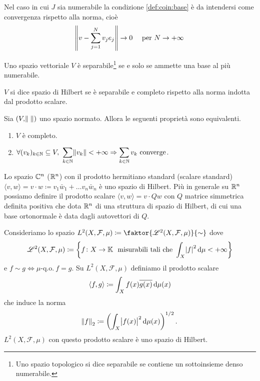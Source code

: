 Nel caso in cui $ J $ sia numerabile la condizione \ref{def:coin:base} è da intendersi come convergenza rispetto alla norma, cioè
\[
    \norm{v - \sum_{j = 1}^{N} v_j e_j} \to 0 \quad \text{ per } N \to +\infty
\]

\begin{proposition}
   Uno spazio vettoriale $ V $ è separabile\footnote{Uno spazio topologico si dice separabile se contiene un sottoinsieme denso numerabile.} se e solo se ammette una base al più numerabile.
\end{proposition}

\begin{definition}
    $ V $ si dice spazio di Hilbert se è separabile e completo rispetto alla norma indotta dal prodotto scalare.
\end{definition}

\begin{thm}
    Sia $ (V, \norm{\;}) $ uno spazio normato. Allora le seguenti proprietà sono equivalenti.
    \begin{enumerate}[label=(\roman*)]
        \item $ V $ è completo.
        \item $ \forall (v_k)_{k \in \mathbb{N}} \subseteq V, \ \displaystyle{\sum_{k \in \mathbb{N}} \norm{v_k} < +\infty \Rightarrow \sum_{k \in \mathbb{N}} v_k} \text{ converge} $. 
    \end{enumerate}
\end{thm}

\begin{example}[$ \R^n, \C^n $]
    Lo spazio $ \mathbb{C}^n $ ($ \mathbb{R}^n $) con il prodotto hermitiano standard (scalare standard) $ {\langle v, w \rangle} = v \cdot w \coloneqq v_1\bar{w}_1 + \ldots v_n\bar{w}_n $ è uno spazio di Hilbert. Più in generale su $ \mathbb{R}^n $ possiamo definire il prodotto scalare $ {\langle v, w \rangle} = v \cdot Qw $ con $ Q $ matrice simmetrica definita positiva che dota $ \mathbb{R}^n $ di una struttura di spazio di Hilbert, di cui una base ortonormale è data dagli autovettori di $ Q $.  
\end{example}

\begin{example}[spazio $ L^2 $]
    Consideriamo lo spazio $ L^2(X, \mathcal{F}, \mu) \coloneqq \faktor{\mathscr{L}^2(X,\mathcal{F},\mu)}{\sim} $ dove
    \[
        \mathscr{L}^2(X,\mathcal{F},\mu) \coloneqq \left\{f \colon X \to \K \ \text{ misurabili tali che } \int_{X} \abs{f}^2 \dif{\mu} < +\infty\right\}
    \]
    e $ f \sim g \iff \mu\text{-q.o.} \ f = g $. Su $ L^2(X, \mathcal{F}, \mu) $ definiamo il prodotto scalare 
    \[
        {\langle f, g \rangle} \coloneqq \int_{X} f(x) \overline{g(x)} \dif{\mu(x)}
    \]
    che induce la norma
    \[
        \norm{f}_2 \coloneqq \left(\int_{X} \abs{f(x)}^2 \dif{\mu(x)}\right)^{1/2}.
    \]
    $ L^2(X, \mathcal{F}, \mu) $ con questo prodotto scalare è uno spazio di Hilbert. 
\end{example}


